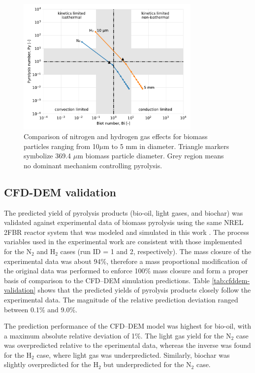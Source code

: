 \begin{figure}[H]
    \centering
    \includegraphics[width=0.8\textwidth]{figures/biot-pyro-diams.pdf}
    \caption{Comparison of nitrogen and hydrogen gas effects for biomass particles ranging from 10$\mu$m to 5 mm in diameter. Triangle markers symbolize 369.4 $\mu$m biomass particle diameter. Grey region means no dominant mechanism controlling pyrolysis.}
    \label{fig:biot-pyro-diams}
\end{figure}


\subsection{CFD-DEM validation}

The predicted yield of pyrolysis products (bio-oil, light gases, and biochar) was validated against experimental data of biomass pyrolysis using the same NREL 2FBR reactor system that was modeled and simulated in this work \cite{French-2021}. The process variables used in the experimental work are consistent with those implemented for the N$_2$ and H$_2$ cases (run ID = 1 and 2, respectively). The mass closure of the experimental data was about 94\%, therefore a mass proportional modification of the original data was performed to enforce 100\% mass closure and form a proper basis of comparison to the CFD--DEM simulation predictions. Table \ref{tab:cfddem-validation} shows that the predicted yields of pyrolysis products closely follow the experimental data. The magnitude of the relative prediction deviation ranged between 0.1\% and 9.0\%.

The prediction performance of the CFD--DEM model was highest for bio-oil, with a maximum absolute relative deviation of 1\%. The light gas yield for the N$_2$ case was overpredicted relative to the eperimental data, whereas the inverse was found for the H$_2$ case, where light gas was underpredicted. Similarly, biochar was slightly overpredicted for the H$_2$ but underpredicted for the N$_2$ case.

